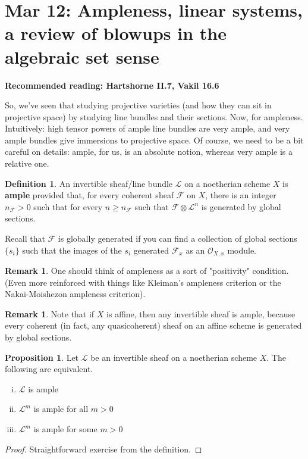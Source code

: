 \documentclass[10pt,reqno]{amsart}
\theoremstyle{definition}
\newtheorem{definition}[theorem]{Definition}
\newtheorem{proposition}[theorem]{Proposition}
\newtheorem{remark}[theorem]{Remark}
\theoremstyle{remark}
\numberwithin{equation}{section}
\numberwithin{theorem}{section}
\newcommand{\OO}{{\mathcal O}}
\newcommand{\FF}{{\mathscr F}}
\newcommand{\LL}{{\mathscr L}}
\begin{document}
\section{Mar 12: Ampleness, linear systems, a review of blowups in the algebraic set sense}

\textbf{Recommended reading: Hartshorne II.7, Vakil 16.6}

So, we've seen that studying projective varieties (and how they can sit in projective space) by studying line bundles and their sections. Now, for ampleness. Intuitively: high tensor powers of ample line bundles are very ample, and very ample bundles give immersions to projective space. Of course, we need to be a bit careful on details: ample, for us, is an absolute notion, whereas very ample is a relative one.

\begin{definition} An invertible sheaf/line bundle $\LL$ on a noetherian scheme $X$ is \textbf{ample} provided that, for every coherent sheaf $\FF$ on $X$, there is an integer $n_{\FF} > 0$ such that for every $n \ge n_{\FF}$ such that $\FF \otimes \LL^n$ is generated by global sections. 

Recall that $\FF$ is globally generated if you can find a collection of global sections $\{s_i\}$ such that the images of the $s_i$ generated $\FF_x$ as an $\OO_{X,x}$ module.
\end{definition}


\begin{remark} One should think of ampleness as a sort of "positivity" condition. (Even more reinforced with things like Kleiman's ampleness criterion or the Nakai-Moishezon ampleness criterion).\end{remark}

\begin{remark}
Note that if $X$ is affine, then any invertible sheaf is ample, because every coherent (in fact, any quasicoherent) sheaf on an affine scheme is generated by global sections.
\end{remark}


\begin{proposition} Let $\LL$ be an invertible sheaf on a noetherian scheme $X$. The following are equivalent.
\begin{enumerate}[(i)]
\item $\LL$ is ample
\item $\LL^m$ is ample for all $m > 0$
\item $\LL^m$ is ample for some $m > 0$
\end{enumerate}
\end{proposition}
\begin{proof} Straightforward exercise from the definition.
\end{proof}
\end{document}
